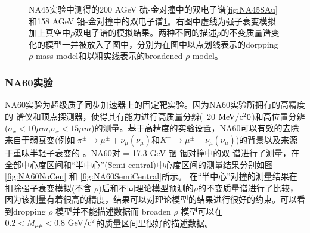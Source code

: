 \begin{figure}[htb]
\begin{subfigure}[b]{0.47\textwidth}
        \caption{}
        \label{fig:NA45PbAu}
    \end{subfigure}
    \caption[NA45实验200 AGeV 硫-金及 158 AGeV 铅-金对撞中的双电子谱]{NA45实验中测得的200 AGeV 硫-金对撞中的双电子谱\ref{fig:NA45SAu}和158 AGeV 铅-金对撞中的双电子谱\ref{fig:NA45PbAu}。右图中虚线为强子衰变模拟加上真空中$\rho$双电子谱的模拟结果。两种不同的描述$\rho$的不变质量谱变化的模型一并被放入了图中，分别为在图中以点划线表示的dorpping $\rho$ mass model和以粗实线表示的broadened $\rho$ model。}
       \label{fig:NA45AA}
\end{figure}

\subsubsection{NA60实验}

NA60实验为超级质子同步加速器上的固定靶实验。因为NA60实验所拥有的高精度的 \muon 谱仪和顶点探测器，使得其有能力进行高质量分辨(~20 $\rm{MeV/c^20}$)和高位置分辨($ \sigma_x < 10 \mu m$,$\sigma_x < 15 \mu m$)的测量。基于高精度的实验设置，NA60可以有效的去除来自于弱衰变(例如 $\pi^{\pm} \rightarrow \mu^{\pm} + \nu_{\mu}(\bar{\nu}_{\mu})$和$K^{\pm} \rightarrow \mu^{\pm} + \nu_{\mu}(\bar{\nu}_{\mu})$)的背景以及来源于重味半轻子衰变的 \muon 。NA60对 \sNN = 17.3 GeV 铟-铟对撞中的双 \muon 谱进行了测量，在全部中心度区间和“半中心”(Semi-central)中心度区间的测量结果分别如图 \ref{fig:NA60NoCen} 和 \ref{fig:NA60SemiCentral}所示。
在“半中心”对撞的测量结果在扣除强子衰变模拟(不含 $\rho$)后和不同理论模型预测的$\rho$的不变质量谱进行了比较，因为该测量有着很高的精度，结果可以对理论模型的结果进行很好的约束。可以看到dropping $\rho$ 模型并不能描述数据而 broaden $\rho$ 模型可以在 $0.2 <  M_{\mu\mu} < 0.8~{\rm GeV/c^2} $的质量区间里很好的描述数据。
